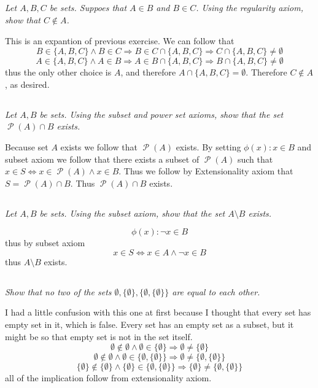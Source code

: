 \documentclass[11pt,oneside,titlepage]{book}
\DeclareMathOperator \pow {\mathcal {P}}
\DeclareMathOperator \lra {\Leftrightarrow}
\DeclareMathOperator \imp {\Rightarrow}
\begin{document}
\subsection{}

\textit{Let $A, B, C$ be sets. Suppoes that $A \in B$ and $B \in C$. Using the regularity axiom,
  show that $C \notin A$.}

This is an expantion of previous exercise. We can follow that
$$B \in \{A, B, C\} \land B \in C \imp B \in C \cap \{A, B, C\} \imp C \cap \{A, B, C\}
\neq \emptyset$$
$$A \in \{A, B, C\} \land A \in B \imp A \in B \cap \{A, B, C\} \imp B \cap \{A, B, C\}
\neq \emptyset$$
thus the only other choice is $A$, and therefore $A \cap  \{A, B, C\} = \emptyset$. Therefore
$C \notin A$, as desired.


\subsection{}

\textit{Let $A, B$ be sets. Using the subset and power set axioms, show that the set
  $\pow(A) \cap B$ exists.}

Because set $A$ exists we follow that $\pow(A)$ exists. By setting $\phi(x): x \in B$ and
subset axiom we follow that there exists a subset of $\pow(A)$ such that
$x \in S \lra x \in \pow(A) \land x \in B$. Thus we follow by Extensionality axiom
that $S = \pow(A) \cap B$. Thus $\pow(A) \cap B$ exists.

\subsection{}

\textit{Let $A, B$ be sets. Using the subset axiom, show that the set $A \setminus B$ exists.}

$$\phi(x): \neg x \in B$$
thus by subset axiom
$$x \in S \lra x \in A \land \neg x \in B$$
thus $A \setminus B$ exists.

\subsection{}

\textit{Show that no two of the sets $\emptyset, \{\emptyset\}, \{\emptyset, \{\emptyset\}\}$
  are equal to each other.}

I had a little confusion with this one at first because I thought that every set has
empty set in it, which is false. Every set has an empty set as a subset, but it
might be so that empty set is not in the set itself.
$$\emptyset \notin \emptyset \land \emptyset \in \{\emptyset\} \imp \emptyset \neq \{\emptyset\}$$
$$\emptyset \notin \emptyset \land \emptyset \in \{\emptyset, \{\emptyset\}\} \imp
\emptyset \neq \{\emptyset, \{\emptyset\}\}$$
$$\{\emptyset\} \notin \{\emptyset\} \land \{\emptyset\} \in \{\emptyset, \{\emptyset\}\} \imp
\{\emptyset\} \neq \{\emptyset, \{\emptyset\}\}$$
all of the implication follow from extensionality axiom.
\end{document}
